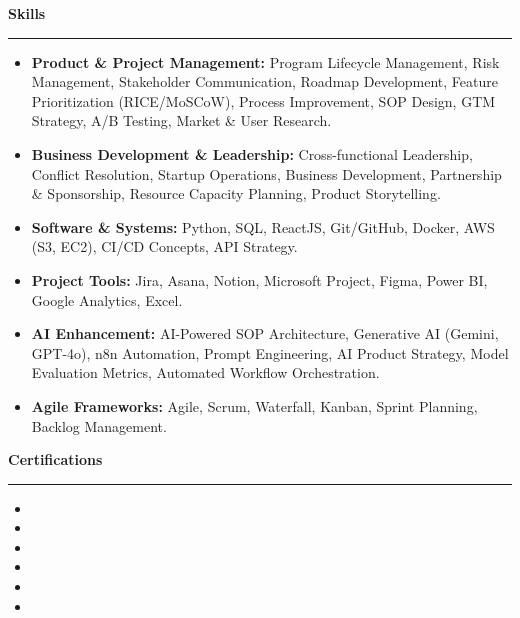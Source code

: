 \documentclass[9pt,letterpaper]{article} %
\newenvironment{rSection}[1]{ %
  \sectionskip
 \textbf{\Large #1} %
  \sectionlineskip
  \hrule %
  \begin{list}{}{ %
    \setlength{\leftmargin}{-0em} %
  }
  \item[]
}{
  \end{list}
}
\def\sectionlineskip{\smallskip} %
\def\sectionskip{} %
\begin{document}
\begin{rSection}{Skills}
\item[] \vspace{-0.5em}
\begin{itemize}[left=-1.5em, labelsep=.1cm, labelwidth=.2cm, itemsep=0.0em]

    \item \textbf{ Product \& Project Management:} Program Lifecycle Management, Risk Management, Stakeholder Communication, Roadmap Development, Feature Prioritization (RICE/MoSCoW), Process Improvement, SOP Design, GTM Strategy, A/B Testing, Market \& User Research.

    \item \textbf{ Business Development \& Leadership:} Cross-functional Leadership, Conflict Resolution, Startup Operations, Business Development, Partnership \& Sponsorship, Resource Capacity Planning, Product Storytelling.

    \item \textbf{ Software \& Systems:} Python, SQL, ReactJS, Git/GitHub, Docker, AWS (S3, EC2), CI/CD Concepts, API Strategy.

    \item \textbf{ Project Tools:} Jira, Asana, Notion, Microsoft Project, Figma, Power BI, Google Analytics, Excel.

    \item \textbf{ AI Enhancement:} AI-Powered SOP Architecture, Generative AI (Gemini, GPT-4o), n8n Automation, Prompt Engineering, AI Product Strategy, Model Evaluation Metrics, Automated Workflow Orchestration.

    \item \textbf{ Agile Frameworks:} Agile, Scrum, Waterfall, Kanban, Sprint Planning, Backlog Management.

\end{itemize}
\end{rSection}

\begin{rSection}{Certifications}
\item[] \vspace{-1em}
\begin{itemize}[left=-1.5em, labelsep=.1cm, labelwidth=.2cm, itemsep=0.0em]

\item 

\item 

\item 

\item 

\item 

\item 

\end{itemize}
\end{rSection}
\end{document}
